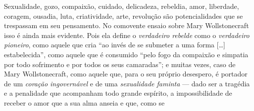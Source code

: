 Sexualidade, gozo,
compaixão, cuidado, delicadeza, rebeldia, amor, liberdade, coragem,
ousadia, luta, criatividade, arte, revolução são potencialidades que se
trespassam em seu pensamento. No comovente ensaio sobre Mary Wollstonecraft isso é
ainda mais evidente. Pois ela define o \textit{verdadeiro rebelde} como o
\textit{verdadeiro pioneiro}, como aquele que cria ``ao invés de se
submeter a uma forma {[}\ldots{]} estabelecida'', como aquele que é
consumido ``pelo fogo da compaixão e simpatia por todo sofrimento e por
todos os seus camaradas''; e muitas vezes, caso de Mary Wollstonecraft,
como aquele que, para o seu próprio desespero, é portador de um
\textit{coração ingovernável} e de uma \textit{sexualidade faminta} ---
dado ser a tragédia e a penalidade que acompanham todo grande espírito,
a impossibilidade de receber o amor que a sua alma anseia e que, como se
